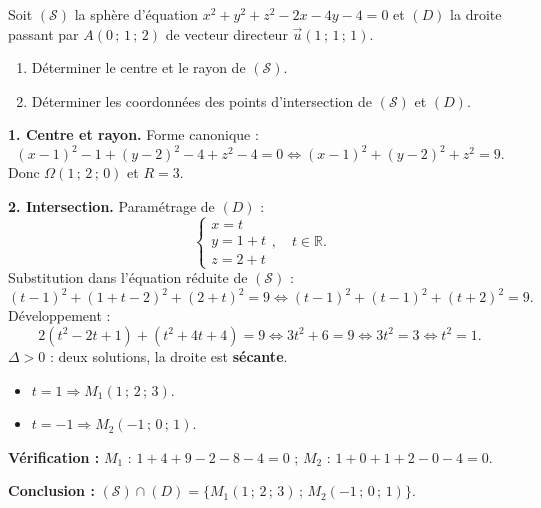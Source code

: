 \documentclass[11pt]{article}
\begin{document}
\begin{exoresolu}
Soit $(\mathcal{S})$ la sphère d'équation $x^2+y^2+z^2-2x-4y-4=0$ et $(D)$ la droite passant par $A(0\,;\,1\,;\,2)$ de vecteur directeur $\vec{u}(1\,;\,1\,;\,1)$.
\begin{enumerate}
\item Déterminer le centre et le rayon de $(\mathcal{S})$.
\item Déterminer les coordonnées des points d'intersection de $(\mathcal{S})$ et $(D)$.
\end{enumerate}
\tcblower
\textbf{1. Centre et rayon.} Forme canonique :
\[ (x-1)^2-1+(y-2)^2-4+z^2-4=0 \iff (x-1)^2+(y-2)^2+z^2=9. \]
Donc $\Omega(1\,;\,2\,;\,0)$ et $R=3$.

\textbf{2. Intersection.} Paramétrage de $(D)$ :
\[ \begin{cases} x = t \\ y = 1+t \\ z = 2+t \end{cases}, \quad t\in\mathbb{R}. \]
Substitution dans l'équation réduite de $(\mathcal{S})$ :
\[ (t-1)^2+(1+t-2)^2+(2+t)^2=9 \iff (t-1)^2+(t-1)^2+(t+2)^2=9. \]
Développement :
\[ 2(t^2-2t+1)+(t^2+4t+4)=9 \iff 3t^2+6=9 \iff 3t^2=3 \iff t^2=1. \]
$\Delta > 0$ : deux solutions, la droite est \textbf{sécante}.
\begin{itemize}
\item $t=1 \Rightarrow M_1(1\,;\,2\,;\,3)$.
\item $t=-1 \Rightarrow M_2(-1\,;\,0\,;\,1)$.
\end{itemize}
\textbf{Vérification :} $M_1$ : $1+4+9-2-8-4=0$ ; $M_2$ : $1+0+1+2-0-4=0$.

\textbf{Conclusion :} $(\mathcal{S})\cap(D)=\{M_1(1\,;\,2\,;\,3)\,;\,M_2(-1\,;\,0\,;\,1)\}$.
\end{exoresolu}
\end{document}
